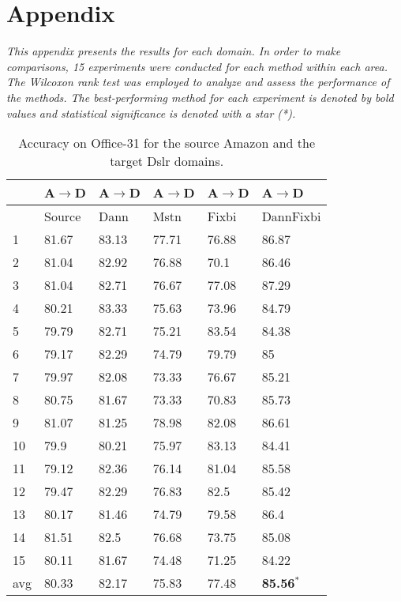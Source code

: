 \section{Appendix} \label{section: appendix A}

\textit{This appendix presents the results for each domain. In order to make comparisons, 15 experiments were conducted for each method within each area. The Wilcoxon rank test was employed to analyze and assess the performance of the methods. The best-performing method for each experiment is denoted by bold values and statistical significance is denoted with a star (*).}

\begin{table}[h]
\centering
\caption{Accuracy on Office-31 for the source Amazon and the target Dslr domains.}
\label{tab:AD}
\begin{tabular}{|p{2cm}|p{2cm}|p{2cm}|p{2cm}|p{2cm}|p{2cm}|}
\hline
   & A$\rightarrow$D & A$\rightarrow$D & A$\rightarrow$D & A$\rightarrow$D & A$\rightarrow$D \\ \hline
 & Source & Dann & Mstn & Fixbi & DannFixbi \\ \hline
1 & 81.67 & 83.13 & 77.71 & 76.88 & 86.87 \\ \hline
2 & 81.04 & 82.92 & 76.88 & 70.1 & 86.46 \\ \hline
3 & 81.04 & 82.71 & 76.67 & 77.08 & 87.29 \\ \hline
4 & 80.21 & 83.33 & 75.63 & 73.96 & 84.79 \\ \hline
5 & 79.79 & 82.71 & 75.21 & 83.54 & 84.38 \\ \hline
6 & 79.17 & 82.29 & 74.79 & 79.79 & 85 \\ \hline
7 & 79.97 & 82.08 & 73.33 & 76.67 & 85.21 \\ \hline
8 & 80.75 & 81.67 & 73.33 & 70.83 & 85.73 \\ \hline
9 & 81.07 & 81.25 & 78.98 & 82.08 & 86.61 \\ \hline
10 & 79.9 & 80.21 & 75.97 & 83.13 & 84.41 \\ \hline
11 & 79.12 & 82.36 & 76.14 & 81.04 & 85.58 \\ \hline
12 & 79.47 & 82.29 & 76.83 & 82.5 & 85.42 \\ \hline
13 & 80.17 & 81.46 & 74.79 & 79.58 & 86.4 \\ \hline
14 & 81.51 & 82.5 & 76.68 & 73.75 & 85.08 \\ \hline
15 & 80.11 & 81.67 & 74.48 & 71.25 & 84.22 \\ \hline 
avg & 80.33 & 82.17 & 75.83 & 77.48 & \textbf{85.56}$^*$ \\ \hline
\end{tabular}
\end{table}

